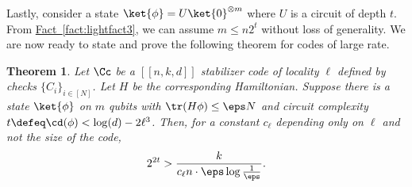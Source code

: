 \documentclass[11pt]{article}
\newcommand{\expref}[2]{\texorpdfstring{\hyperref[#2]{#1~\ref{#2}}}{#1~\ref{#2}}}
\newtheorem{theorem}{Theorem}[section]
\begin{document}
Lastly, consider a state $\ket{\phi}=U\ket{0}^{\otimes m}$ where $U$ is a circuit of depth $t$. From \expref{Fact}{fact:lightfact3}, we can assume $m\leq n 2^t$ without loss of generality. We are now ready to state and prove {the following theorem for codes of large rate.} %

\begin{theorem}
\label{thm:main-technical}
Let $\Cc$ be a $[[n,k,d]]$ stabilizer code of locality $\ell$ defined by checks $\{C_i\}_{i \in [N]}$. Let $H$ be the corresponding Hamiltonian. Suppose there is a state $\ket{\phi}$ on $m$ qubits with $\tr(H\phi) \leq \eps N$ and circuit complexity $t \defeq \cd(\phi) < \log(d) - 2 \ell^3$. Then, for a constant $c_\ell$ depending only on $\ell$ and not the size of the code,
\begin{align}
    2^{2t} > \frac{k}{c_\ell n \cdot \eps\log\frac{1}{\eps}}.
\end{align}
\end{theorem}
\end{document}
